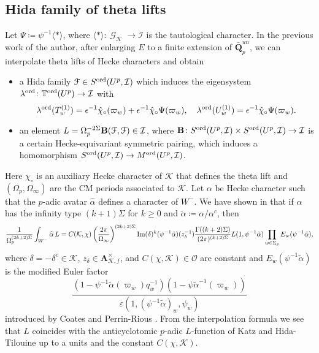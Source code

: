 \documentclass[leqno]{amsart}
\theoremstyle{definition}
\theoremstyle{remark}
\newcommand{\oo}{\mathcal{O}}
\newcommand{\Q}{{\mathbf{Q}}}
\newcommand{\A}{\mathbf A}
\DeclareMathOperator{\Gal}{\mathcal{G}}
\newcommand{\K}{{\mathcal{K}}} %
\newcommand{\bw}{{\overline{w}}}
\newcommand{\TT}{\mathbb{T}} %
\newcommand{\euF}{\EuScript{F}} %
\newcommand{\I}{\mathcal{I}} %
\newcommand{\ord}{\textnormal{ord}} %
\begin{document}
\subsection{Hida family of theta lifts}

Let $\Psi\coloneqq \psi^{-1}\langle*\rangle$,
where $\langle*\rangle\colon \Gal_\K\to \I$ is the tautological character.
In the previous work \cite{lee} of the author,
after enlarging $E$ to a finite extension
of $\bar{\Q}_p^{un}$,
we can interpolate
theta lifts of Hecke characters and obtain
\begin{itemize}
    \item a Hida family $\euF\in S^{\ord}(U^p,\I)$ which induces
    the eigensystem $\lambda^{\ord}\colon \TT^{\ord}(U^p)\to\I$
    with 
    \begin{equation}\label{eq:eigen}
        \lambda^{\ord}(T_w^{(1)})=
        \epsilon^{-1}\hat{\chi}_\circ(\varpi_w)+
        \epsilon^{-1}\hat{\chi}_\circ\Psi(\varpi_w),\quad
        \lambda^{\ord}(U_w^{(1)})=
        \epsilon^{-1}\hat{\chi}_\circ\Psi(\varpi_w).
    \end{equation}
    \item an element
    $L=\Omega_p^{-2\Sigma}\mathbf{B}(\euF,\euF)\in \I$, where 
    $\mathbf{B}\colon S^{\ord}(U^p,\I)\times S^{\ord}(U^p,\I)\to\I$ 
    is a certain Hecke-equivariant symmetric pairing, which induces
    a homomorphism $S^{\ord}(U^p,\I)\to M^{\ord}(U^p,\I)$.
\end{itemize}

Here $\chi_\circ$ is an auxiliary Hecke character of $\K$ that
defines the theta lift and $(\Omega_p,\Omega_\infty)$ 
are the CM periods associated to $\K$.
Let $\alpha$ be Hecke character such that the $p$-adic avatar
$\widehat{\alpha}$ defines a character of $W^-$.
We have shown in \cite{lee2} that if $\alpha$ 
has the infinity type $(k+1)\Sigma$ for $k\geq0$ and $\tilde{\alpha}\coloneqq\alpha/\alpha^c$,
then
\begin{equation*}
        \frac{1}{\Omega_p^{(2k+2)\Sigma}}
        \int_{W^-}\widehat{\alpha}\,L=C(\K,\chi)
        \left(\frac{2\pi}{\Omega_\infty}\right)^{(2k+2)\Sigma}
    \textnormal{Im}(\delta)^{k}(\psi^{-1}\tilde{\alpha})(z_\delta^{-1})
    \frac{\Gamma((k+2)\Sigma)}{(2\pi)^{(k+2)\Sigma}}
    L(1,\psi^{-1}\tilde{\alpha})
    \prod_{w\in \Sigma_p}E_w(\psi^{-1}\tilde{\alpha}),
\end{equation*}
where $\delta=-\delta^c\in\K$, $z_\delta\in \A_{\K,f}^\times$,
and $C(\chi,\K)\in\oo$ are constant and
$E_w(\psi^{-1}\tilde{\alpha})$ is the modified Euler factor 
\[
\frac{
(1-\psi^{-1}\tilde{\alpha}(\varpi_\bw)q_\bw^{-1})
(1-\psi\tilde{\alpha}^{-1}(\varpi_w))}
{{\varepsilon(1,(\psi^{-1}\tilde{\alpha})_w,\psi_w)}}
\]
introduced by Coates and Perrin-Rious \cite{CP89}.
From the interpolation formula we see that
$L$ coincides with the anticyclotomic $p$-adic $L$-function
of Katz and Hida-Tilouine up to a units and the constant $C(\chi,\K)$.
\end{document}
